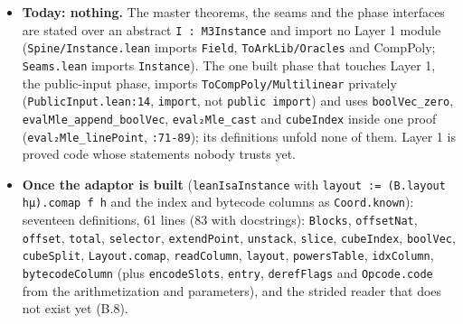 \begin{itemize}
\item \textbf{Today: nothing.} The master theorems, the seams and the phase interfaces are stated over an abstract \texttt{I : M3Instance} and import no Layer 1 module (\texttt{Spine/\allowbreak{}Instance.\allowbreak{}lean} imports \texttt{Field}, \texttt{ToArkLib/\allowbreak{}Oracles} and CompPoly; \texttt{Seams.\allowbreak{}lean} imports \texttt{Instance}). The one built phase that touches Layer 1, the public-input phase, imports \texttt{ToCompPoly/\allowbreak{}Multilinear} privately (\texttt{PublicInput.\allowbreak{}lean:14}, \texttt{import}, not \texttt{public import}) and uses \texttt{boolVec\_\allowbreak{}zero}, \texttt{evalMle\_\allowbreak{}append\_\allowbreak{}boolVec}, \texttt{eval₂Mle\_\allowbreak{}cast} and \texttt{cubeIndex} inside one proof (\texttt{eval₂Mle\_\allowbreak{}linePoint}, \texttt{:71-{}89}); its definitions unfold none of them. Layer 1 is proved code whose statements nobody trusts yet.
\item \textbf{Once the adaptor is built} (\texttt{leanIsaInstance} with \texttt{l\allowbreak{}a\allowbreak{}y\allowbreak{}o\allowbreak{}u\allowbreak{}t\allowbreak{} :\allowbreak{}=\allowbreak{} (\allowbreak{}B\allowbreak{}.\allowbreak{}l\allowbreak{}a\allowbreak{}y\allowbreak{}o\allowbreak{}u\allowbreak{}t\allowbreak{} h\allowbreak{}μ\allowbreak{})\allowbreak{}.\allowbreak{}c\allowbreak{}o\allowbreak{}m\allowbreak{}a\allowbreak{}p\allowbreak{} f\allowbreak{} h} and the index and bytecode columns as \texttt{Coord.\allowbreak{}known}): seventeen definitions, 61 lines (83 with docstrings): \texttt{Blocks}, \texttt{offsetNat}, \texttt{offset}, \texttt{total}, \texttt{selector}, \texttt{extendPoint}, \texttt{unstack}, \texttt{slice}, \texttt{cubeIndex}, \texttt{boolVec}, \texttt{cubeSplit}, \texttt{Layout.\allowbreak{}comap}, \texttt{readColumn}, \texttt{layout}, \texttt{powersTable}, \texttt{idxColumn}, \texttt{bytecodeColumn} (plus \texttt{encodeSlots}, \texttt{entry}, \texttt{derefFlags} and \texttt{Opcode.\allowbreak{}code} from the arithmetization and parameters), and the strided reader that does not exist yet (B.8).

\end{itemize}
